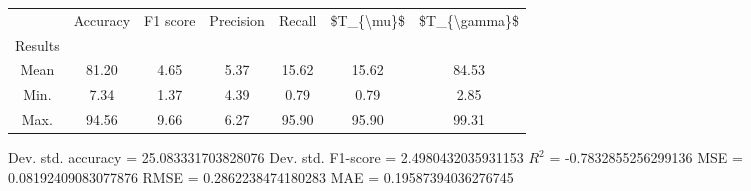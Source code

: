 \begin{tabular}{|c|c|c|c|c|c|c|}
\toprule
{} &  Accuracy &  F1 score &  Precision &  Recall &  \$T\_\{\textbackslash mu\}\$ &  \$T\_\{\textbackslash gamma\}\$ \\
Results &           &           &            &         &            &               \\
\hline
Mean    &     81.20 &      4.65 &       5.37 &   15.62 &      15.62 &         84.53 \\
Min.    &      7.34 &      1.37 &       4.39 &    0.79 &       0.79 &          2.85 \\
Max.    &     94.56 &      9.66 &       6.27 &   95.90 &      95.90 &         99.31 \\
\bottomrule
\end{tabular}

 Dev. std. accuracy = 25.083331703828076
 Dev. std. F1-score = 2.4980432035931153
 $R^2$ = -0.7832855256299136
 MSE = 0.08192409083077876
 RMSE = 0.2862238474180283
 MAE = 0.19587394036276745